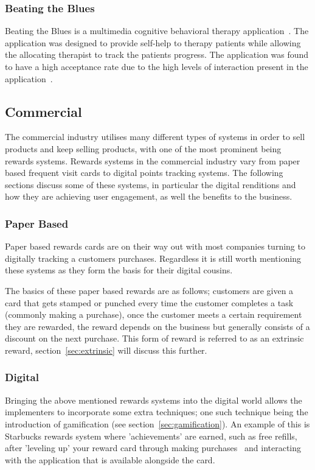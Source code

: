 \documentclass[a4paper,12pt]{article}
\begin{document}
\subsubsection{Beating the Blues}
Beating the Blues is a multimedia cognitive behavioral therapy application~\citep{beating-the-blues}.
The application was designed to provide self-help to therapy patients while allowing the allocating therapist to track the patients progress.
The application was found to have a high acceptance rate due to the high levels of interaction present in the application~\citep{beating-the-blues,games-for-behavior-change}. 


\subsection{Commercial}
The commercial industry utilises many different types of systems in order to sell products and keep selling products, with one of the most prominent being rewards systems. 
Rewards systems in the commercial industry vary from paper based frequent visit cards to digital points tracking systems. 
The following sections discuss some of these systems, in particular the digital renditions and how they are achieving user engagement, as well the benefits to the business.

\subsubsection{Paper Based}
Paper based rewards cards are on their way out with most companies turning to digitally tracking a customers purchases. 
Regardless it is still worth mentioning these systems as they form the basis for their digital cousins.

\par
The basics of these paper based rewards are as follows; customers are given a card that gets stamped or punched every time the customer completes a task (commonly making a purchase), once the customer meets a certain requirement they are rewarded, the reward depends on the business but generally consists of a discount on the next purchase. 
This form of reward is referred to as an extrinsic reward, section~\ref{sec:extrinsic} will discuss this further.

\subsubsection{Digital}
Bringing the above mentioned rewards systems into the digital world allows the implementers to incorporate some extra techniques; one such technique being the introduction of gamification (see section~\ref{sec:gamification}). 
An example of this is Starbucks rewards system where 'achievements' are earned, such as free refills, after 'leveling up' your reward card through making purchases~\citep{gamifying-intelligent-environments} and interacting with the application that is available alongside the card.
\end{document}
